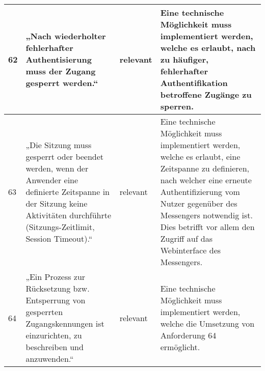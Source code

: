 \begin{longtable}{p{0.6cm}|p{6cm}|p{2cm}|p{6cm}}
    62     & „Nach wiederholter fehlerhafter Authentisierung muss der Zugang gesperrt werden.“                                                                                                                                                                                                                    & relevant           & Eine technische Möglichkeit muss implementiert werden, welche es erlaubt, nach zu häufiger, fehlerhafter Authentifikation betroffene Zugänge zu sperren.                                                                                                                                                                                                                                                                                                                                                                                                            \\ \hline
    63     & „Die Sitzung muss gesperrt oder beendet werden, wenn der Anwender eine definierte Zeitspanne in der Sitzung keine Aktivitäten durchführte (Sitzungs-Zeitlimit, Session Timeout).“                                                                                                                    & relevant           & Eine technische Möglichkeit muss implementiert werden, welche es erlaubt, eine Zeitspanne zu definieren, nach welcher eine erneute Authentifizierung vom Nutzer gegenüber des Messengers notwendig ist. Dies betrifft vor allem den Zugriff auf das Webinterface des Messengers.                                                                                                                                                                                                                                                                                    \\ \hline
    64     & „Ein Prozess zur Rücksetzung bzw. Entsperrung von gesperrten Zugangskennungen ist einzurichten, zu beschreiben und anzuwenden.“                                                                                                                                                                      & relevant           & Eine technische Möglichkeit muss implementiert werden, welche die Umsetzung von Anforderung 64 ermöglicht.                                                                                                                                                                                                                                                                                                                                                                                                                                                          \\ \hline

\end{longtable}
